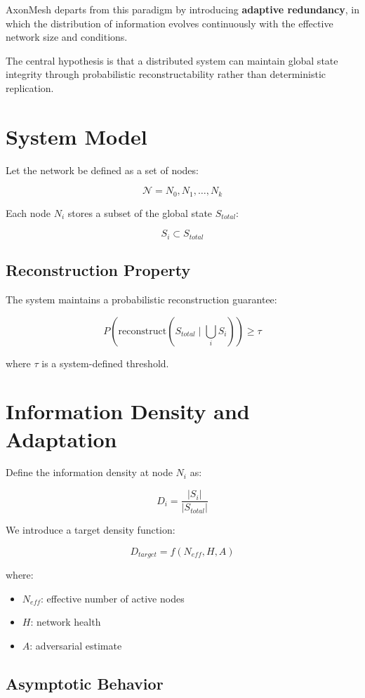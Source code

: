 \documentclass[11pt]{article}
\begin{document}
AxonMesh departs from this paradigm by introducing \textbf{adaptive redundancy}, in which the distribution of information evolves continuously with the effective network size and conditions.

The central hypothesis is that a distributed system can maintain global state integrity through probabilistic reconstructability rather than deterministic replication.

\section{System Model}

Let the network be defined as a set of nodes:

\[
\mathcal{N} = {N_0, N_1, \dots, N_k}
\]

Each node $N_i$ stores a subset of the global state $S_{total}$:

\[
S_i \subset S_{total}
\]

\subsection{Reconstruction Property}

The system maintains a probabilistic reconstruction guarantee:

\[
P(\text{reconstruct}(S_{total} \mid \bigcup_i S_i)) \geq \tau
\]

where $\tau$ is a system-defined threshold.

\section{Information Density and Adaptation}

Define the information density at node $N_i$ as:

\[
D_i = \frac{|S_i|}{|S_{total}|}
\]

We introduce a target density function:

\[
D_{target} = f(N_{eff}, H, A)
\]

where:
\begin{itemize}
\item $N_{eff}$: effective number of active nodes
\item $H$: network health
\item $A$: adversarial estimate
\end{itemize}

\subsection{Asymptotic Behavior}
\end{document}
